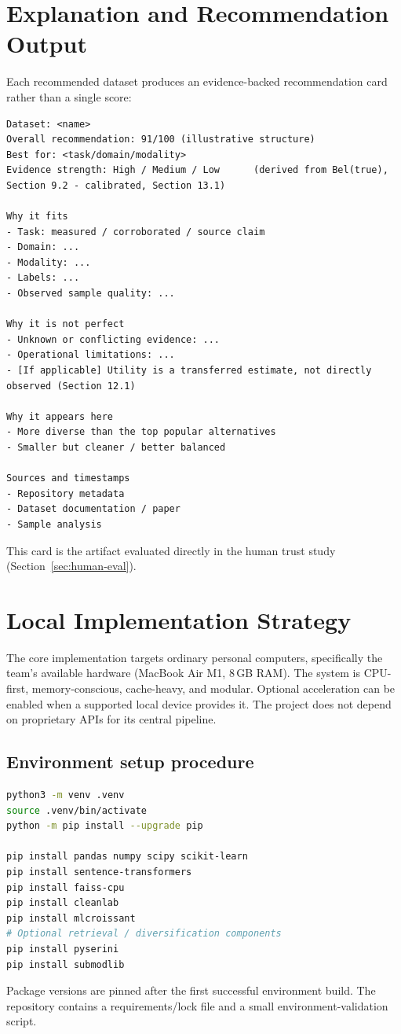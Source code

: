 \documentclass[11pt]{article}
\begin{document}
\section{Explanation and Recommendation Output}
Each recommended dataset produces an evidence-backed recommendation card rather than a single score:
\begin{lstlisting}[basicstyle=\ttfamily\footnotesize]
Dataset: <name>
Overall recommendation: 91/100 (illustrative structure)
Best for: <task/domain/modality>
Evidence strength: High / Medium / Low      (derived from Bel(true), Section 9.2 - calibrated, Section 13.1)

Why it fits
- Task: measured / corroborated / source claim
- Domain: ...
- Modality: ...
- Labels: ...
- Observed sample quality: ...

Why it is not perfect
- Unknown or conflicting evidence: ...
- Operational limitations: ...
- [If applicable] Utility is a transferred estimate, not directly observed (Section 12.1)

Why it appears here
- More diverse than the top popular alternatives
- Smaller but cleaner / better balanced

Sources and timestamps
- Repository metadata
- Dataset documentation / paper
- Sample analysis
\end{lstlisting}
This card is the artifact evaluated directly in the human trust study (Section~\ref{sec:human-eval}).

\section{Local Implementation Strategy}
The core implementation targets ordinary personal computers, specifically the team's available hardware
(MacBook Air M1, 8\,GB RAM). The system is CPU-first, memory-conscious, cache-heavy, and modular. Optional
acceleration can be enabled when a supported local device provides it. The project does not depend on
proprietary APIs for its central pipeline.

\subsection{Environment setup procedure}
\begin{lstlisting}[language=bash]
python3 -m venv .venv
source .venv/bin/activate
python -m pip install --upgrade pip

pip install pandas numpy scipy scikit-learn
pip install sentence-transformers
pip install faiss-cpu
pip install cleanlab
pip install mlcroissant
# Optional retrieval / diversification components
pip install pyserini
pip install submodlib
\end{lstlisting}
Package versions are pinned after the first successful environment build. The repository contains a
requirements/lock file and a small environment-validation script.
\end{document}
